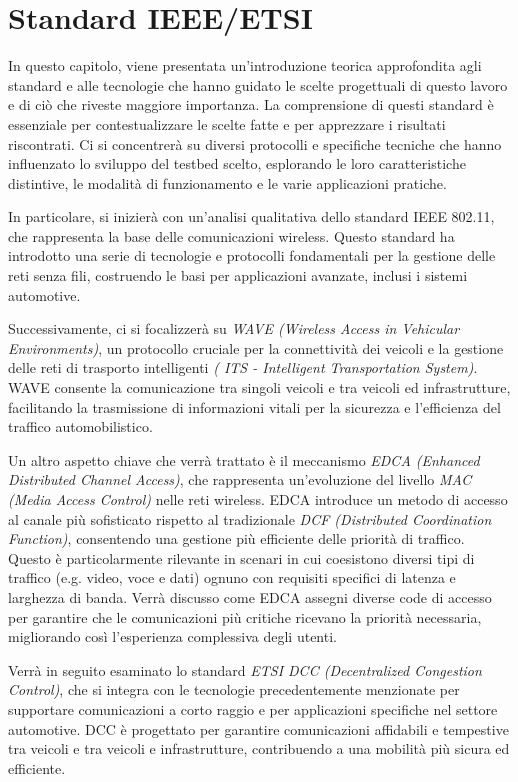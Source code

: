 \chapter{Standard IEEE/ETSI}

In questo capitolo, viene presentata un'introduzione teorica approfondita agli standard e alle tecnologie che hanno guidato le scelte progettuali di questo lavoro e di ciò che riveste maggiore importanza. La comprensione di questi standard è essenziale per contestualizzare le scelte fatte e per apprezzare i risultati riscontrati. Ci si concentrerà su diversi protocolli e specifiche tecniche che hanno influenzato lo sviluppo del testbed scelto, esplorando le loro caratteristiche distintive, le modalità di funzionamento e le varie applicazioni pratiche.

In particolare, si inizierà con un'analisi qualitativa dello standard IEEE 802.11, che rappresenta la base delle comunicazioni wireless. Questo standard ha introdotto una serie di tecnologie e protocolli fondamentali per la gestione delle reti senza fili, costruendo le basi per applicazioni avanzate, inclusi i sistemi automotive.

Successivamente, ci si focalizzerà su \textit{WAVE (Wireless Access in Vehicular Environments)}, un protocollo cruciale per la connettività dei veicoli e la gestione delle reti di trasporto intelligenti \textit{( ITS - Intelligent Transportation System)}. WAVE consente la comunicazione tra singoli veicoli e tra veicoli ed infrastrutture, facilitando la trasmissione di informazioni vitali per la sicurezza e l'efficienza del traffico automobilistico.

Un altro aspetto chiave che verrà trattato è il meccanismo \textit{EDCA (Enhanced Distributed Channel Access)}, che rappresenta un'evoluzione del livello \textit{MAC (Media Access Control)} nelle reti wireless. EDCA introduce un metodo di accesso al canale più sofisticato rispetto al tradizionale \textit{DCF (Distributed Coordination Function)}, consentendo una gestione più efficiente delle priorità di traffico. Questo è particolarmente rilevante in scenari in cui coesistono diversi tipi di traffico (e.g. video, voce e dati) ognuno con requisiti specifici di latenza e larghezza di banda. Verrà discusso come EDCA assegni diverse code di accesso per garantire che le comunicazioni più critiche ricevano la priorità necessaria, migliorando così l'esperienza complessiva degli utenti.

Verrà in seguito esaminato lo standard \textit{ETSI DCC (Decentralized Congestion Control)}, che si integra con le tecnologie precedentemente menzionate per supportare comunicazioni a corto raggio e per applicazioni specifiche nel settore automotive. DCC è progettato per garantire comunicazioni affidabili e tempestive tra veicoli e tra veicoli e infrastrutture, contribuendo a una mobilità più sicura ed efficiente.

